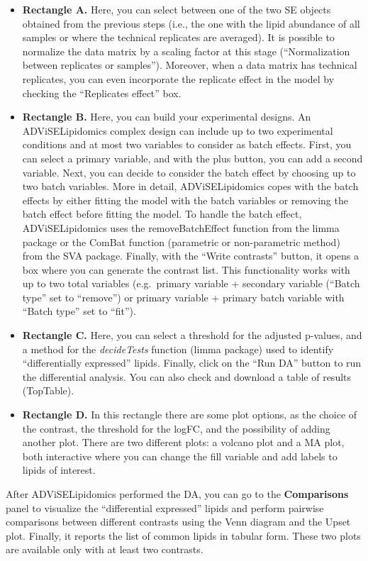 \documentclass[
]{book}
\providecommand{\tightlist}{%
  \setlength{\itemsep}{0pt}\setlength{\parskip}{0pt}}
\begin{document}
\begin{itemize}
\tightlist
\item
  \textbf{Rectangle A.} Here, you can select between one of the two SE objects obtained from the previous steps (i.e., the one with the lipid abundance of all samples or where the technical replicates are averaged). It is possible to normalize the data matrix by a scaling factor at this stage (``Normalization between replicates or samples''). Moreover, when a data matrix has technical replicates, you can even incorporate the replicate effect in the model by checking the ``Replicates effect'' box.
\item
  \textbf{Rectangle B.} Here, you can build your experimental designs. An ADViSELipidomics complex design can include up to two experimental conditions and at most two variables to consider as batch effects. First, you can select a primary variable, and with the plus button, you can add a second variable. Next, you can decide to consider the batch effect by choosing up to two batch variables. More in detail, ADViSELipidomics copes with the batch effects by either fitting the model with the batch variables or removing the batch effect before fitting the model. To handle the batch effect, ADViSELipidomics uses the removeBatchEffect function from the limma package or the ComBat function (parametric or non-parametric method) from the SVA package. Finally, with the ``Write contrasts'' button, it opens a box where you can generate the contrast list. This functionality works with up to two total variables (e.g.~primary variable + secondary variable (``Batch type'' set to ``remove'') or primary variable + primary batch variable with ``Batch type'' set to ``fit'').
\item
  \textbf{Rectangle C.} Here, you can select a threshold for the adjusted p-values, and a method for the \emph{decideTests} function (limma package) used to identify ``differentially expressed'' lipids. Finally, click on the ``Run DA'' button to run the differential analysis. You can also check and download a table of results (TopTable).
\item
  \textbf{Rectangle D.} In this rectangle there are some plot options, as the choice of the contrast, the threshold for the logFC, and the possibility of adding another plot. There are two different plots: a volcano plot and a MA plot, both interactive where you can change the fill variable and add labels to lipids of interest.
\end{itemize}

After ADViSELipidomics performed the DA, you can go to the \textbf{Comparisons} panel to visualize the ``differential expressed'' lipids and perform pairwise comparisons between different contrasts using the Venn diagram and the Upset plot. Finally, it reports the list of common lipids in tabular form. These two plots are available only with at least two contrasts.
\end{document}
